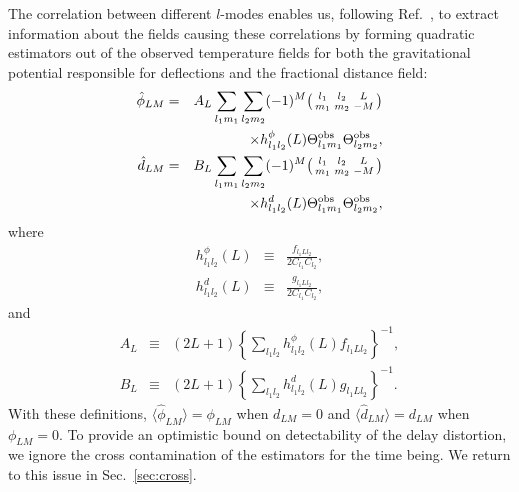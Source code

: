\documentclass[prd,amsmath,amssymb,floatfix,superscriptaddress,nofootinbib,twocolumn]{revtex4-1}
\def\bea{\begin{eqnarray}}
\def\eea{\end{eqnarray}}
\newcommand{\eql}[1]{\label{eq:#1}}
\newcommand{\scott}[1]{{\color{darkgreen} #1}}
\newcommand{\peikai}[1]{{\color{blue} #1}}
\newcommand{\wh}[1]{{\color{red} #1}}
\begin{document}
The correlation between different $l$-modes enables us, following Ref.~\cite{Okamoto:2003zw}, to extract information about the fields causing these correlations by forming quadratic estimators out of the observed temperature fields for both the gravitational potential responsible for deflections and the fractional distance field:
\bea
\hat \phi_{LM} &=& A_L 
\sum_{l_1m_1}\sum_{l_2m_2} 
 (-1)^M  \bigl(\begin{smallmatrix} l_1 & l_2 & L \\ m_1 & m_2 & -M  \end{smallmatrix}\bigr) 
 \nonumber \\  && \times 
 h^{\phi}_{l_1l_2}(L)  \tob_{l_1m_1} \tob_{l_2m_2}, \nonumber \\
\hat d_{LM} &=& B_{L} \sum_{l_1m_1}\sum_{l_2m_2}
(-1)^M  \bigl(\begin{smallmatrix} l_1 & l_2 & L \\ m_1 & m_2 & -M  \end{smallmatrix}\bigr) 
\nonumber \\ && \times
h^{d}_{l_1l_2}(L)  \tob_{l_1m_1} \tob_{l_2m_2}, \eql{distest}
\eea
where
\bea
h^{\phi}_{l_1l_2}(L)&\equiv& \frac{f_{l_1Ll_2}}{2C_{l_1}C_{l_2}} ,\nonumber\\
h^{d}_{l_1l_2}(L)&\equiv& \frac{g_{l_1Ll_2}}{2C_{l_1}C_{l_2}},\eql{defh}
\eea
and %
\bea
A_L &\equiv& 
(2L+1)
 \left\{ \sum_{l_1l_2} h^{\phi}_{l_1l_2}(L)f_{l_1Ll_2}\right\}^{-1},\nonumber\\
B_L &\equiv& (2L+1) \left\{ \sum_{l_1l_2} h^{d}_{l_1l_2}(L)g_{l_1Ll_2}\right\}^{-1}.\eql{bt}
\eea 
With these definitions, 
$\langle \hat\phi_{LM} \rangle = \phi_{LM}$ when $d_{LM}=0$ and
$\langle \hat d _{LM} \rangle = d_{LM}$ when $\phi_{LM}=0$.  To provide an optimistic bound
on detectability of the delay distortion, we ignore the cross contamination of the estimators for the time being. We return to this  issue in Sec.~\ref{sec:cross}.


\end{document}
